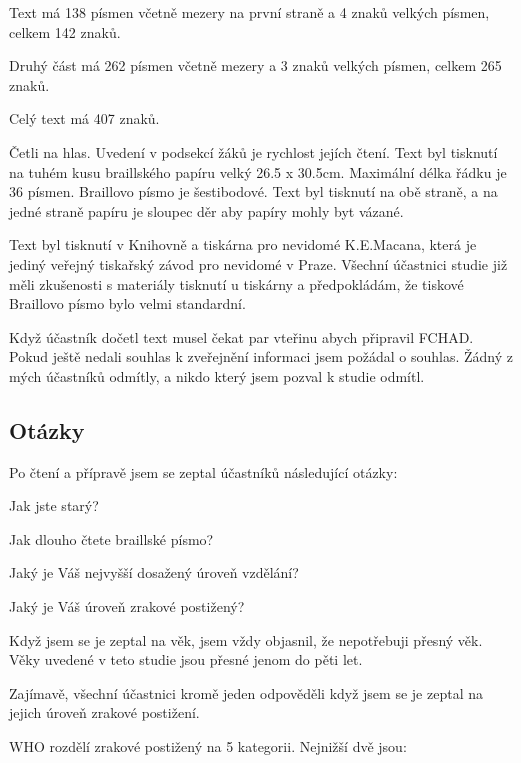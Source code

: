Text má 138 písmen včetně mezery na první straně a 4 znaků velkých písmen, celkem 142 znaků.

Druhý část má 262 písmen včetně mezery a 3 znaků velkých písmen, celkem 265 znaků.

Celý text má 407 znaků.

Četli na hlas.  Uvedení v podsekcí žáků je rychlost jejích čtení. Text byl tisknutí na tuhém kusu braillského papíru velký 26.5 x 30.5cm.  Maximální délka řádku je 36 písmen.  Braillovo písmo je šestibodové.  Text byl tisknutí na obě straně, a na jedné straně papíru je sloupec děr aby papíry mohly byt vázané.

Text byl tisknutí v Knihovně a tiskárna pro nevidomé K.E.Macana, která je jediný veřejný tiskařský závod pro nevidomé v Praze.  Všechní účastnici studie již měli zkušenosti s materiály tisknutí u tiskárny a předpokládám, že tiskové Braillovo písmo bylo velmi standardní.

Když účastník dočetl text musel čekat par vteřinu abych připravil FCHAD. Pokud ještě nedali souhlas k zveřejnění informaci jsem požádal o souhlas.  Žádný z mých účastníků odmítly, a nikdo který jsem pozval k studie odmítl.

\subsection{Otázky}

Po čtení a přípravě jsem se zeptal účastníků následující otázky:

Jak jste starý?

Jak dlouho čtete braillské písmo?

Jaký je Váš nejvyšší dosažený úroveň vzdělání?

Jaký je Váš úroveň zrakové postižený?

Když jsem se je zeptal na věk, jsem vždy objasnil, že nepotřebuji přesný věk.  Věky uvedené v teto studie jsou přesné jenom do pěti let.

Zajímavě, všechní účastnici kromě jeden odpověděli  když jsem se je zeptal na jejich úroveň zrakové postižení.

WHO rozdělí zrakové postižený na 5 kategorii. Nejnižší dvě jsou:

\em {} \em \citep{sonsklasifikace}

